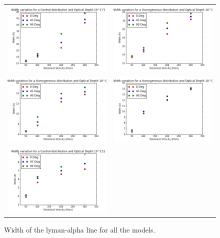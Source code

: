 \documentclass{article}
\theoremstyle{definition}
\theoremstyle{remark}
\begin{document}
\begin{figure}[H]

  \centering

  \label{figur}\caption{Width of the lyman-alpha line for all the models. }

  \begin{tabular}{cc}

    
    \includegraphics[width=60mm]{WidthCentral.png}&

    \includegraphics[width=60mm]{WidthHomogeneous.png}\\

    \includegraphics[width=60mm]{Width6.png}&

    \includegraphics[width=60mm]{Width6HOM.png}\\

    \includegraphics[width=60mm]{Width5.png}&


\end{tabular}
\end{figure}
\end{document}
